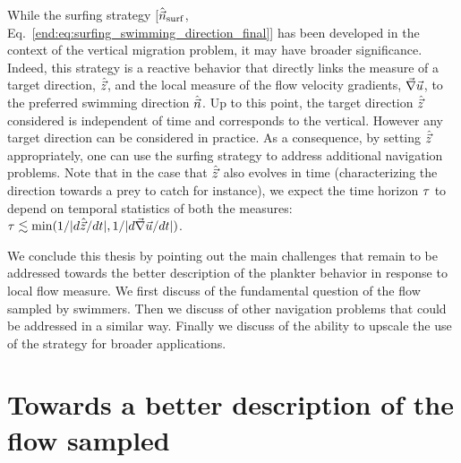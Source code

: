 While the surfing strategy [$\hat{\vec{n}}_{\mathrm{surf}}$, Eq.~\eqref{end:eq:surfing_swimming_direction_final}] has been developed in the context of the vertical migration problem, it may have broader significance.
Indeed, this strategy is a reactive behavior that directly links the measure of a target direction, $\hat{\vec{z}}$, and the local measure of the flow velocity gradients, $\vec{\nabla} \vec{u}$, to the preferred swimming direction $\hat{\vec{n}}$.
Up to this point, the target direction $\hat{\vec{z}}$ considered is independent of time and corresponds to the vertical.
However any target direction can be considered in practice.
As a consequence, by setting $\hat{\vec{z}}$ appropriately, one can use the surfing strategy to address additional navigation problems.
Note that in the case that $\hat{\vec{z}}$ also evolves in time (characterizing the direction towards a prey to catch for instance), we expect the time horizon $\tau$ to depend on temporal statistics of both the measures: $\tau \lesssim \min(1/\lvert d\hat{\vec{z}}/dt\rvert, 1/\lvert d\vec{\nabla} \vec{u}/dt\rvert)$.

We conclude this thesis by pointing out the main challenges that remain to be addressed towards the better description of the plankter behavior in response to local flow measure.
We first discuss of the fundamental question of the flow sampled by swimmers.
Then we discuss of other navigation problems that could be addressed in a similar way.
Finally we discuss of the ability to upscale the use of the strategy for broader applications.

\section{Towards a better description of the flow sampled}

